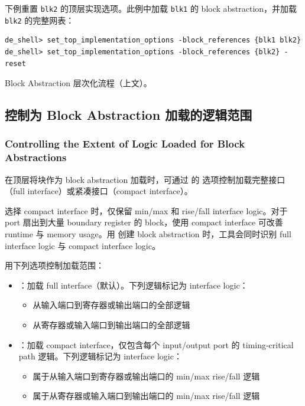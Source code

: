 下例重置 \texttt{blk2} 的顶层实现选项。此例中加载 \texttt{blk1} 的 block abstraction，并加载 \texttt{blk2} 的完整网表：
\begin{lstlisting}
de_shell> set_top_implementation_options -block_references {blk1 blk2}
de_shell> set_top_implementation_options -block_references {blk2} -reset
\end{lstlisting}

\begin{seeAlsoBox}
Block Abstraction 层次化流程（上文）。
\end{seeAlsoBox}

\subsection{控制为 Block Abstraction 加载的逻辑范围}
\subsubsection*{Controlling the Extent of Logic Loaded for Block Abstractions}

在顶层将块作为 block abstraction 加载时，可通过  的  选项控制加载完整接口（full interface）或紧凑接口（compact interface）。

选择 compact interface 时，仅保留 min/max 和 rise/fall interface logic。对于 port 扇出到大量 boundary register 的 block，使用 compact interface 可改善 runtime 与 memory usage。用  创建 block abstraction 时，工具会同时识别 full interface logic 与 compact interface logic。

用下列选项控制加载范围：
\begin{itemize}
  \item {}：加载 full interface（默认）。下列逻辑标记为 interface logic：
  \begin{itemize}
    \item 从输入端口到寄存器或输出端口的全部逻辑
    \item 从寄存器或输入端口到输出端口的全部逻辑
  \end{itemize}
  \item {}：加载 compact interface，仅包含每个 input/output port 的 timing-critical path 逻辑。下列逻辑标记为 interface logic：
  \begin{itemize}
    \item 属于从输入端口到寄存器或输出端口的 min/max rise/fall 逻辑
    \item 属于从寄存器或输入端口到输出端口的 min/max rise/fall 逻辑
  \end{itemize}
\end{itemize}

